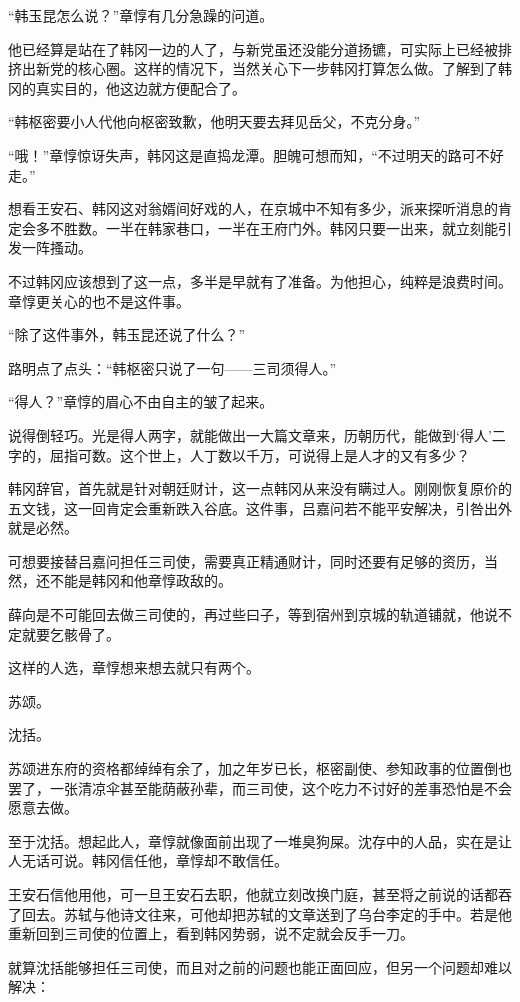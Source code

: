 “韩玉昆怎么说？”章惇有几分急躁的问道。

他已经算是站在了韩冈一边的人了，与新党虽还没能分道扬镳，可实际上已经被排挤出新党的核心圈。这样的情况下，当然关心下一步韩冈打算怎么做。了解到了韩冈的真实目的，他这边就方便配合了。

“韩枢密要小人代他向枢密致歉，他明天要去拜见岳父，不克分身。”

“哦！”章惇惊讶失声，韩冈这是直捣龙潭。胆魄可想而知，“不过明天的路可不好走。”

想看王安石、韩冈这对翁婿间好戏的人，在京城中不知有多少，派来探听消息的肯定会多不胜数。一半在韩家巷口，一半在王府门外。韩冈只要一出来，就立刻能引发一阵搔动。

不过韩冈应该想到了这一点，多半是早就有了准备。为他担心，纯粹是浪费时间。章惇更关心的也不是这件事。

“除了这件事外，韩玉昆还说了什么？”

路明点了点头：“韩枢密只说了一句——三司须得人。”

“得人？”章惇的眉心不由自主的皱了起来。

说得倒轻巧。光是得人两字，就能做出一大篇文章来，历朝历代，能做到‘得人’二字的，屈指可数。这个世上，人丁数以千万，可说得上是人才的又有多少？

韩冈辞官，首先就是针对朝廷财计，这一点韩冈从来没有瞒过人。刚刚恢复原价的五文钱，这一回肯定会重新跌入谷底。这件事，吕嘉问若不能平安解决，引咎出外就是必然。

可想要接替吕嘉问担任三司使，需要真正精通财计，同时还要有足够的资历，当然，还不能是韩冈和他章惇政敌的。

薛向是不可能回去做三司使的，再过些曰子，等到宿州到京城的轨道铺就，他说不定就要乞骸骨了。

这样的人选，章惇想来想去就只有两个。

苏颂。

沈括。

苏颂进东府的资格都绰绰有余了，加之年岁已长，枢密副使、参知政事的位置倒也罢了，一张清凉伞甚至能荫蔽孙辈，而三司使，这个吃力不讨好的差事恐怕是不会愿意去做。

至于沈括。想起此人，章惇就像面前出现了一堆臭狗屎。沈存中的人品，实在是让人无话可说。韩冈信任他，章惇却不敢信任。

王安石信他用他，可一旦王安石去职，他就立刻改换门庭，甚至将之前说的话都吞了回去。苏轼与他诗文往来，可他却把苏轼的文章送到了乌台李定的手中。若是他重新回到三司使的位置上，看到韩冈势弱，说不定就会反手一刀。

就算沈括能够担任三司使，而且对之前的问题也能正面回应，但另一个问题却难以解决：

